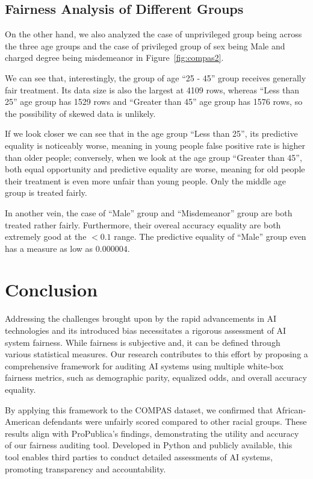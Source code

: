 \documentclass[conference]{IEEEtran}
\begin{document}
\subsection{Fairness Analysis of Different Groups}
On the other hand, we also analyzed the case of unprivileged group being across the three age groups and the case of privileged group of sex being Male and charged degree being misdemeanor in Figure~\ref{fig:compas2}.

We can see that, interestingly, the group of age ``25 - 45'' group receives generally fair treatment. Its data size is also the largest at 4109 rows, whereas ``Less than 25'' age group has 1529 rows and ``Greater than 45'' age group has 1576 rows, so the possibility of skewed data is unlikely.

If we look closer we can see that in the age group ``Less than 25'', its predictive equality is noticeably worse, meaning in young people false positive rate is higher than older people; conversely, when we look at the age group ``Greater than 45'', both equal opportunity and predictive equality are worse, meaning for old people their treatment is even more unfair than young people. Only the middle age group is treated fairly.

In another vein, the case of ``Male'' group and ``Misdemeanor'' group are both treated rather fairly. Furthermore, their overeal accuracy equality are both extremely good at the $< 0.1$ range. The predictive equality  of ``Male'' group even has a measure as low as $0.000004$.

\section{Conclusion}
Addressing the challenges brought upon by the rapid advancements in AI technologies and its introduced bias necessitates a rigorous assessment of AI system fairness. While fairness is subjective and, it can be defined through various statistical measures. Our research contributes to this effort by proposing a comprehensive framework for auditing AI systems using multiple white-box fairness metrics, such as demographic parity, equalized odds, and overall accuracy equality.

By applying this framework to the COMPAS dataset, we confirmed that African-American defendants were unfairly scored compared to other racial groups. These results align with ProPublica's findings, demonstrating the utility and accuracy of our fairness auditing tool. Developed in Python and publicly available, this tool enables third parties to conduct detailed assessments of AI systems, promoting transparency and accountability.
\end{document}
